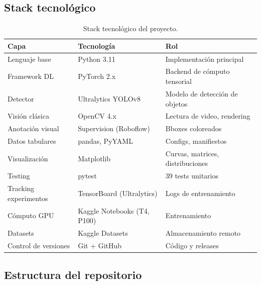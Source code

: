 \documentclass[11pt,a4paper]{article}
\begin{document}
\subsection{Stack tecnológico}

\begin{table}[H]
\centering
\caption{Stack tecnológico del proyecto.}
\begin{tabular}{lll}
\toprule
\textbf{Capa} & \textbf{Tecnología} & \textbf{Rol} \\
\midrule
Lenguaje base & Python 3.11 & Implementación principal \\
Framework DL & PyTorch 2.x & Backend de cómputo tensorial \\
Detector & Ultralytics YOLOv8 & Modelo de detección de objetos \\
Visión clásica & OpenCV 4.x & Lectura de video, rendering \\
Anotación visual & Supervision (Roboflow) & Bboxes coloreados \\
Datos tabulares & pandas, PyYAML & Configs, manifiestos \\
Visualización & Matplotlib & Curvas, matrices, distribuciones \\
Testing & pytest & 39 tests unitarios \\
Tracking experimentos & TensorBoard (Ultralytics) & Logs de entrenamiento \\
Cómputo GPU & Kaggle Notebooks (T4, P100) & Entrenamiento \\
Datasets & Kaggle Datasets & Almacenamiento remoto \\
Control de versiones & Git + GitHub & Código y releases \\
\bottomrule
\end{tabular}
\end{table}

\subsection{Estructura del repositorio}
\end{document}
